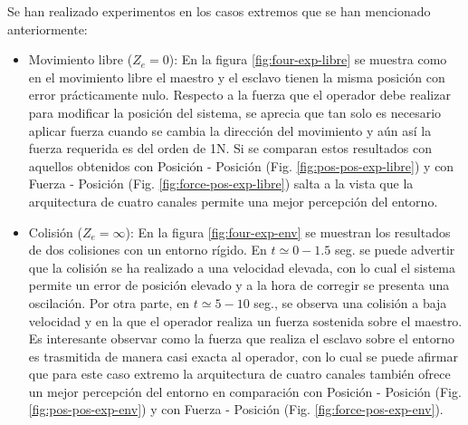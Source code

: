 Se han realizado experimentos en los casos extremos que se han mencionado anteriormente:
\begin{itemize}
\item Movimiento libre ($Z_e = 0$): En la figura \ref{fig:four-exp-libre} se muestra como en el movimiento libre el maestro y el esclavo tienen la misma posición con error prácticamente nulo. Respecto a la fuerza que el operador debe realizar para modificar la posición del sistema, se aprecia que tan solo es necesario aplicar fuerza cuando se cambia la dirección del movimiento y aún así la fuerza requerida es del orden de 1N. Si se comparan estos resultados con aquellos obtenidos con Posición - Posición (Fig. \ref{fig:pos-pos-exp-libre}) y con Fuerza - Posición (Fig. \ref{fig:force-pos-exp-libre}) salta a la vista que la arquitectura de cuatro canales permite una mejor percepción del entorno.

\item Colisión ($Z_e = \infty$): En la figura \ref{fig:four-exp-env} se muestran los resultados de dos colisiones con un entorno rígido. En $t\simeq 0-1.5$ seg. se puede advertir que la colisión se ha realizado a una velocidad elevada, con lo cual el sistema permite un error de posición elevado y a la hora de corregir se presenta una oscilación. Por otra parte, en $t\simeq 5-10$ seg., se observa una colisión a baja velocidad y en la que el operador realiza un fuerza sostenida sobre el maestro. Es interesante observar como la fuerza que realiza el esclavo sobre el entorno es trasmitida de manera casi exacta al operador, con lo cual se puede afirmar que para este caso extremo la arquitectura de cuatro canales también ofrece un mejor percepción del entorno en comparación con Posición - Posición (Fig. \ref{fig:pos-pos-exp-env}) y con Fuerza - Posición (Fig. \ref{fig:force-pos-exp-env}).
\end{itemize}

